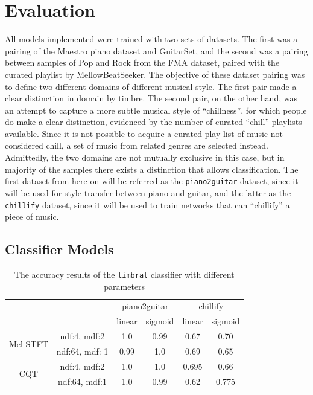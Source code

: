\documentclass[12pt,a4paper,]{report}
\begin{document}
\hypertarget{evaluation}{%
\chapter{Evaluation}\label{evaluation}}

All models implemented were trained with two sets of datasets. The first
was a pairing of the Maestro piano dataset and GuitarSet, and the second
was a pairing between samples of Pop and Rock from the FMA dataset,
paired with the curated playlist by MellowBeatSeeker. The objective of
these dataset pairing was to define two different domains of different
musical style. The first pair made a clear distinction in domain by
timbre. The second pair, on the other hand, was an attempt to capture a
more subtle musical style of ``chillness'', for which people do make a
clear distinction, evidenced by the number of curated ``chill''
playlists available. Since it is not possible to acquire a curated play
list of music not considered chill, a set of music from related genres
are selected instead. Admittedly, the two domains are not mutually
exclusive in this case, but in majority of the samples there exists a
distinction that allows classification. The first dataset from here on
will be referred as the \texttt{piano2guitar} dataset, since it will be
used for style transfer between piano and guitar, and the latter as the
\texttt{chillify} dataset, since it will be used to train networks that
can ``chillify'' a piece of music.

\hypertarget{classifier-models}{%
\section{Classifier Models}\label{classifier-models}}

\begin{table}[h]
\begin{tabular}{cc|c|c|c|c|}
\cline{3-6}
                                                &                & \multicolumn{2}{c|}{piano2guitar} & \multicolumn{2}{c|}{chillify} \\ \cline{3-6} 
                                                &                & linear  & sigmoid & linear & sigmoid \\ \hline
\multicolumn{1}{|c|}{\multirow{2}{*}{Mel-STFT}} & ndf:4, mdf:2   & 1.0     & 0.99    & 0.67   & 0.70    \\ \cline{2-6} 
\multicolumn{1}{|c|}{}                          & ndf:64, mdf: 1 & 0.99    & 1.0     & 0.69   & 0.65    \\ \hline
\multicolumn{1}{|c|}{\multirow{2}{*}{CQT}}      & ndf:4, mdf:2   & 1.0     & 1.0     & 0.695   & 0.66    \\ \cline{2-6} 
\multicolumn{1}{|c|}{}                          & ndf:64, mdf:1  & 1.0     & 0.99    & 0.62   & 0.775    \\ \hline
\end{tabular}
\centering
\caption{The accuracy results of the \texttt{timbral} classifier with different parameters} \label{tab:timbral}
\end{table}
\end{document}
